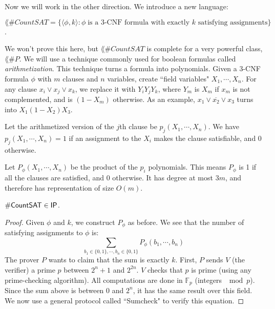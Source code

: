 Now we will work in the other direction. We introduce a new language:
\newcommand{\CountSAT}{\lang{\#CountSAT}}
\begin{definition}
$\CountSAT = \{\langle \phi, k \rangle \colon \phi\;\text{is a 3-CNF formula with exactly $k$ satisfying assignments}\}$.
\end{definition}
We won't prove this here, but $\CountSAT$ is complete for a very powerful class, $\lang{\#P}$. We will use a technique commonly used for boolean formulas called \emph{arithmetization}. This technique turns a formula into polynomials. Given a 3-CNF formula $\phi$ with $m$ clauses and $n$ variables, create ``field variables" $X_1, \cdots, X_n$. For any clause $x_i \vee x_j \vee x_k$, we replace it with $Y_iY_jY_k$, where $Y_m$ is $X_m$ if $x_m$ is not complemented, and is $(1-X_m)$ otherwise. As an example, $x_1 \vee \overline{x_2} \vee x_3$ turns into $X_1(1-X_2)X_3$. 

\par Let the arithmetized version of the $j$th clause be $p_j(X_1, \cdots, X_n)$. We have $p_j(X_1, \cdots, X_n) = 1$ if an assignment to the $X_i$ makes the clause satisfiable, and 0 otherwise. 

\par Let $P_{\phi}(X_1, \cdots, X_n)$ be the product of the $p_i$ polynomials. This means $P_{\phi}$ is 1 if all the clauses are satisfied, and 0 otherwise. It has degree at most $3m$, and therefore has representation of size $O(m)$. 

\begin{theorem}
$\CountSAT \in \IP$.
\end{theorem}

\begin{proof}
Given $\phi$ and $k$, we construct $P_{\phi}$ as before. We see that the number of satisfying assignments to $\phi$ is:
\[
\sum_{b_1 \in \{0, 1\}, \cdots, b_n \in \{0, 1\}} P_{\phi}(b_1, \cdots, b_n)
\]
The prover $P$ wants to claim that the sum is exactly $k$. First, $P$ sends $V$ (the verifier) a prime $p$ between $2^n+1$ and $2^{2n}$. $V$ checks that $p$ is prime (using any prime-checking algorithm). All computations are done in $\mathbb{F}_p$ (integers $\mod p$). Since the sum above is between 0 and $2^n$, it has the same result over this field. We now use a general protocol called ``Sumcheck" to verify this equation.

\par 
\end{proof}
